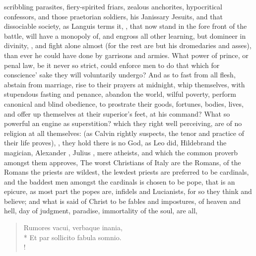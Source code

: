 {scribbling parasites, fiery-spirited friars, zealous anchorites,
hypocritical confessors, and those praetorian soldiers, his Janissary
Jesuits, and that dissociable society, as Languis terms it,
, that now stand in the
fore front of the battle, will have a monopoly of, and engross all
other learning, but domineer in divinity, , and fight alone almost (for the rest are but his
dromedaries and asses), than ever he could have done by garrisons and
armies. What power of prince, or penal law, be it never so strict,
could enforce men to do that which for conscience' sake they will
voluntarily undergo? And as to fast from all flesh, abstain from
marriage, rise to their prayers at midnight, whip themselves, with
stupendous fasting and penance, abandon the world, wilful poverty,
perform canonical and blind obedience, to prostrate their goods,
fortunes, bodies, lives, and offer up themselves at their superior's
feet, at his command? What so powerful an engine as superstition? which
they right well perceiving, are of no religion at all themselves:
 (as Calvin rightly suspects, the tenor and practice of
their life proves), , they hold there is no God, as Leo  did,
Hildebrand the magician, Alexander , Julius , mere atheists, and
which the common proverb amongst them approves, The worst
Christians of Italy are the Romans, of the Romans the priests are
wildest, the lewdest priests are preferred to be cardinals, and the
baddest men amongst the cardinals is chosen to be pope, that is an
epicure, as most part the popes are, infidels and Lucianists, for so
they think and believe; and what is said of Christ to be fables and
impostures, of heaven and hell, day of judgment, paradise, immortality
of the soul, are all,

\begin{latin}
\begin{verse}%
Rumores vacui, verbaque inania,\\*
Et par sollicito fabula somnio.\\!
\end{verse}%
\end{latin}

}
